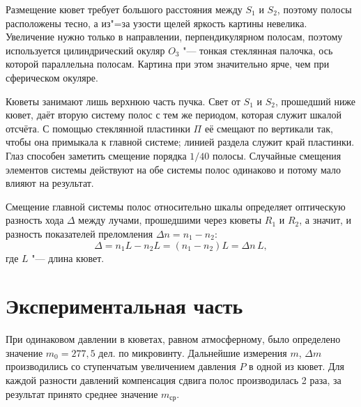 \documentclass[14pt,a4paper]{extarticle}
\begin{document}
Размещение кювет требует большого расстояния между $S_1$ и $S_2$, поэтому полосы расположены тесно, а из"=за узости щелей яркость картины невелика. Увеличение нужно только в направлении, перпендикулярном полосам, поэтому используется цилиндрический окуляр $O_3$ "--- тонкая стеклянная палочка, ось которой параллельна полосам. Картина при этом значительно ярче, чем при сферическом окуляре.

Кюветы занимают лишь верхнюю часть пучка. Свет от $S_1$ и $S_2$, прошедший ниже кювет, даёт вторую систему полос с тем же периодом, которая служит шкалой отсчёта. С помощью стеклянной пластинки $\Pi$ её смещают по вертикали так, чтобы она примыкала к главной системе; линией раздела служит край пластинки. Глаз способен заметить смещение порядка $1/40$ полосы. Случайные смещения элементов системы действуют на обе системы полос одинаково и потому мало влияют на результат.

Смещение главной системы полос относительно шкалы определяет оптическую разность хода $\Delta$ между лучами, прошедшими через кюветы $R_1$ и $R_2$, а значит, и разность показателей преломления $\Delta n = n_1 - n_2$:
\begin{equation}
    \Delta = n_1 L - n_2 L = (n_1 - n_2)L = \Delta n\, L,
\end{equation}
где $L$ "--- длина кювет.
\section*{Экспериментальная часть}

При одинаковом давлении в кюветах, равном атмосферному, было определено значение $m_0 = 277{,}5$ дел. по микровинту.
Дальнейшие измерения $m$, $\Delta m$ производились со ступенчатым увеличением давления $P$ в одной из кювет.
Для каждой разности давлений компенсация сдвига полос производилась 2 раза, за результат принято среднее значение $m_{\text{ср}}$.
\end{document}
